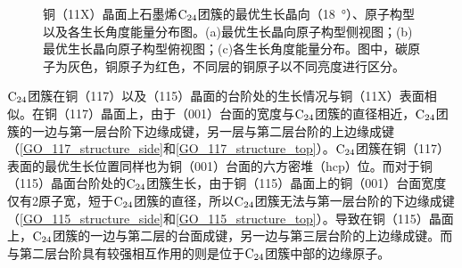         \begin{figure}[htbp]
            \quad
            \caption{铜（11X）晶面上石墨烯$\rm{C_{24}}$团簇的最优生长晶向（\SI{18}  {\degree}）、原子构型以及各生长角度能量分布图。(a)最优生长晶向原子构型侧视图；(b)最优生长晶向原子构型俯视图；(c)各生长角度能量分布。图中，碳原子为灰色，铜原子为红色，不同层的铜原子以不同亮度进行区分。}
            \label{GO_C24_11X}
        \end{figure}

        $\rm{C_{24}}$团簇在铜（117）以及（115）晶面的台阶处的生长情况与铜（11X）表面相似。在铜（117）晶面上，由于（001）台面的宽度与$\rm{C_{24}}$团簇的直径相近，$\rm{C_{24}}$团簇的一边与第一层台阶下边缘成键，另一层与第二层台阶的上边缘成键（\ref{GO_117_structure_side}和\ref{GO_117_structure_top}）。$\rm{C_{24}}$团簇在铜（117）表面的最优生长位置同样也为铜（001）台面的六方密堆（hcp）位。而对于铜（115）晶面台阶处的$\rm{C_{24}}$团簇生长，由于铜（115）晶面上的铜（001）台面宽度仅有2原子宽，短于$\rm{C_{24}}$团簇的直径，所以$\rm{C_{24}}$团簇无法与第一层台阶的下边缘成键（\ref{GO_115_structure_side}和\ref{GO_115_structure_top}）。导致在铜（115）晶面上，$\rm{C_{24}}$团簇的一边与第二层的台面成键，另一边与第三层台阶的上边缘成键。而与第二层台阶具有较强相互作用的则是位于$\rm{C_{24}}$团簇中部的边缘原子。


